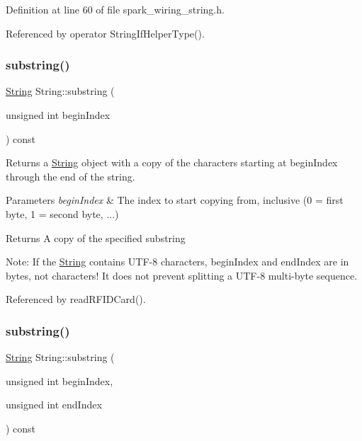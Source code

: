 Definition at line 60 of file spark\+\_\+wiring\+\_\+string.\+h.



Referenced by operator String\+If\+Helper\+Type().

\mbox{\label{class_string_a36b10b81c1556de6e5c63fd060347f30}} 
\subsubsection{\texorpdfstring{substring()}{substring()}\hspace{0.1cm}{\footnotesize\ttfamily [1/2]}}
{\footnotesize\ttfamily \hyperlink{class_string}{String} String\+::substring (\begin{DoxyParamCaption}\item[{unsigned int}]{begin\+Index }\end{DoxyParamCaption}) const}



Returns a \hyperlink{class_string}{String} object with a copy of the characters starting at begin\+Index through the end of the string. 


\begin{DoxyParams}{Parameters}
{\em begin\+Index} & The index to start copying from, inclusive (0 = first byte, 1 = second byte, ...)\\
\hline
\end{DoxyParams}
\begin{DoxyReturn}{Returns}
A copy of the specified substring
\end{DoxyReturn}
Note\+: If the \hyperlink{class_string}{String} contains U\+T\+F-\/8 characters, begin\+Index and end\+Index are in bytes, not characters! It does not prevent splitting a U\+T\+F-\/8 multi-\/byte sequence. 

Referenced by read\+R\+F\+I\+D\+Card().

\mbox{\label{class_string_ad04cc1c85089951dc3a182b4397a9f40}} 
\subsubsection{\texorpdfstring{substring()}{substring()}\hspace{0.1cm}{\footnotesize\ttfamily [2/2]}}
{\footnotesize\ttfamily \hyperlink{class_string}{String} String\+::substring (\begin{DoxyParamCaption}\item[{unsigned int}]{begin\+Index,  }\item[{unsigned int}]{end\+Index }\end{DoxyParamCaption}) const}



